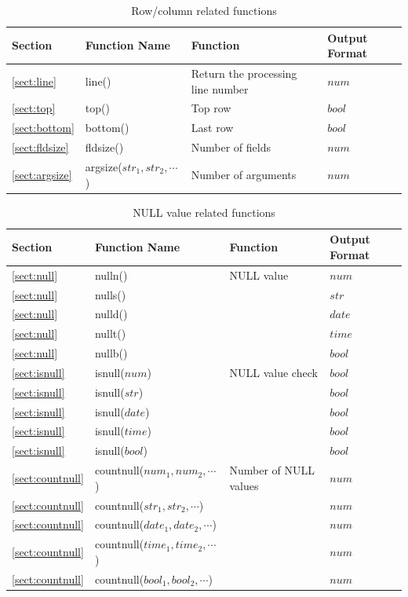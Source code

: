 \begin{table}[!hb]
\begin{center}
\caption{Row/column related functions \label{tbl:mcal_line}}

{\small
  \begin{tabular}{l|l|l|l} \hline
Section&Function Name&Function&Output Format\\ \hline

\ref{sect:line}   & line()   & Return the processing line number &$num$\\
\ref{sect:top}    & top()    & Top row &$bool$\\
\ref{sect:bottom} & bottom() &Last row&$bool$\\
\ref{sect:fldsize}& fldsize()&Number of fields&$num$\\
\ref{sect:argsize}& argsize($str_1,str_2,\cdots$)&Number of arguments &$num$\\

\hline
  \end{tabular}
  }
  \end{center}
\end{table}

\begin{table}[!hb]
\begin{center}
\caption{NULL value related functions\label{tbl:mcal_null}}
{\small
  \begin{tabular}{l|l|l|l} \hline
Section&Function Name&Function&Output Format\\ \hline

\ref{sect:null}& nulln()&NULL value& $num$ \\
\ref{sect:null}& nulls()&      & $str$ \\
\ref{sect:null}& nulld()&      & $date$ \\
\ref{sect:null}& nullt()&      & $time$ \\
\ref{sect:null}& nullb()&      & $bool$ \\
\hline
\ref{sect:isnull}& isnull($num$)&NULL value check& $bool$\\
\ref{sect:isnull}& isnull($str$)&          & $bool$\\
\ref{sect:isnull}& isnull($date$)&         & $bool$\\
\ref{sect:isnull}& isnull($time$)&         & $bool$\\
\ref{sect:isnull}& isnull($bool$)&         & $bool$\\
\hline
\ref{sect:countnull}& countnull($num_1,num_2,\cdots$)& Number of NULL values & $num$\\
\ref{sect:countnull}& countnull($str_1,str_2,\cdots$)& & $num$\\
\ref{sect:countnull}& countnull($date_1,date_2,\cdots$)& & $num$\\
\ref{sect:countnull}& countnull($time_1,time_2,\cdots$)& & $num$\\
\ref{sect:countnull}& countnull($bool_1,bool_2,\cdots$)& & $num$\\

\hline
  \end{tabular}
  }
  \end{center}
\end{table}


